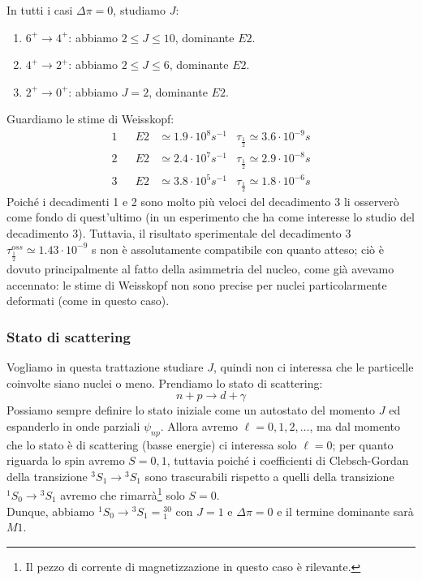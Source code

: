 In tutti i casi $\Delta\pi =0 $, studiamo $J$:
\begin{enumerate}
    \item $6^+\to4^+$: abbiamo $2\leq J \leq 10$, dominante $E2$.
    \item $4^+\to2^+$: abbiamo $2\leq J \leq 6$, dominante $E2$.
    \item $2^+\to0^+$: abbiamo $J=2$, dominante $E2$.
\end{enumerate}
Guardiamo le stime di Weisskopf:
\begin{displaymath}
\begin{aligned}
1& & E2&\simeq 1.9 \cdot 10^8 \unit{s}^{-1} & \tau_{\frac{1}{2}} \simeq 3.6 \cdot 10^{-9} \unit{s} \\
2& & E2&\simeq 2.4 \cdot 10^7 \unit{s}^{-1} & \tau_{\frac{1}{2}} \simeq 2.9 \cdot 10^{-8} \unit{s} \\
3& & E2&\simeq 3.8 \cdot 10^5 \unit{s}^{-1} & \tau_{\frac{1}{2}} \simeq 1.8 \cdot 10^{-6} \unit{s} 
\end{aligned}
\end{displaymath}
Poiché i decadimenti 1 e 2 sono molto più veloci del decadimento 3 li osserverò come fondo di quest'ultimo (in un esperimento che ha come interesse lo studio del decadimento 3). Tuttavia, il risultato sperimentale del decadimento 3 $\tau_{\frac{1}{2}}^{oss}\simeq 1.43\cdot10^{-9}$ s non è assolutamente compatibile con quanto atteso; ciò è dovuto principalmente al fatto della asimmetria del nucleo, come già avevamo accennato: le stime di Weisskopf non sono precise per nuclei particolarmente deformati (come in questo caso).

\subsubsection{Stato di scattering}
Vogliamo in questa trattazione studiare $J$, quindi non ci interessa che le particelle coinvolte siano nuclei o meno. Prendiamo lo stato di scattering:
$$n+p \to d + \gamma$$
Possiamo sempre definire lo stato iniziale come un autostato del momento $J$ ed espanderlo in onde parziali $\psi_{np}$. Allora avremo $\ell = 0,1,2,\dots$, ma dal momento che lo stato è di scattering (basse energie) ci interessa solo $\ell=0$; per quanto riguarda lo spin avremo $S=0,1$, tuttavia poiché i coefficienti di Clebsch-Gordan della transizione ${^3S_1}\to {^3S_1}$ sono trascurabili rispetto a quelli della transizione ${^1S_0}\to {^3S_1}$ avremo che rimarrà\footnote{Il pezzo di corrente di magnetizzazione in questo caso è rilevante.} solo $S=0$.\\
Dunque, abbiamo ${^1S_0}\to {^3S_1}={^30_1}$ con $J=1$ e $\Delta\pi  = 0$ e il termine dominante sarà $M1$.
